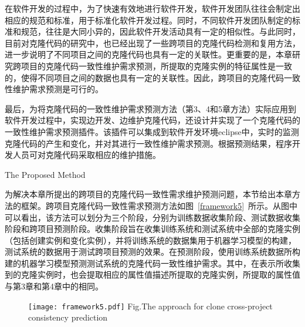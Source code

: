 在软件开发的过程中，为了快速有效地进行软件开发，软件开发团队往往会制定出相应的规范和标准，用于标准化软件开发过程。同时，不同软件开发团队制定的标准和规范，往往是大同小异的，因此软件开发活动具有一定的相似性。与此同时，目前对克隆代码的研究中，也已经出现了一些跨项目的克隆代码检测和复用方法\cite{ishihara2012inter,cheng2016feasibility}，进一步说明了不同项目之间的克隆代码也具有一定的关联性。更重要的是，本章研究跨项目的克隆代码一致性维护需求预测，所提取的克隆实例的特征属性是一致的，使得不同项目之间的数据也具有一定的关联性。因此，跨项目的克隆代码一致性维护需求预测是可行的。

最后，为将克隆代码的一致性维护需求预测方法（第3、4和5章方法）实际应用到软件开发过程中，实现边开发、边维护克隆代码，还设计并实现了一个克隆代码的一致性维护需求预测插件。该插件可以集成到软件开发环境eclipse中，实时的监测克隆代码的产生和变化，并对其进行一致性维护需求预测。根据预测结果，程序开发人员可对克隆代码采取相应的维护措施。


{The Proposed Method}

为解决本章所提出的跨项目的克隆代码一致性需求维护预测问题，本节给出本章方法的框架。跨项目克隆代码一致性需求预测方法如图~\ref{framework5}~所示。从图中可以看出，该方法可以划分为三个阶段，分别为训练数据收集阶段、测试数据收集阶段和跨项目预测阶段。收集阶段旨在收集训练系统和测试系统中全部的克隆实例（包括创建实例和变化实例），并将训练系统的数据集用于机器学习模型的构建，测试系统的数据用于测试跨项目预测的效果。在预测阶段，使用训练系统数据所构建的机器学习模型预测测试系统的克隆代码一致性维护需求。其中，在表示所收集到的克隆实例时，也会提取相应的属性值描述所提取的克隆实例，所提取的属性值与第3章和第4章中的相同。

\begin{figure}[htbp]
\centering
\texttt{[image: framework5.pdf]}
{Fig.$\!$}{The approach for clone cross-project consistency prediction}
\vspace{-1em}
\end{figure}

